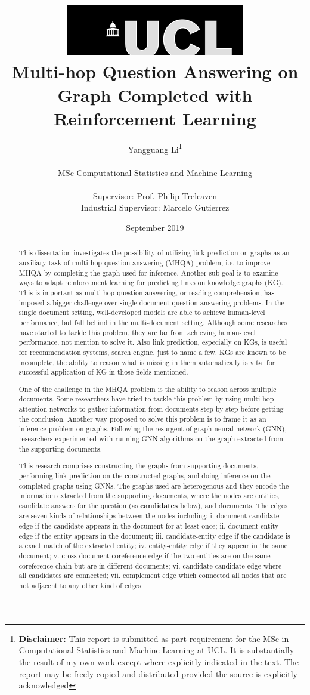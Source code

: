\documentclass{report}
\title{         { \includegraphics[scale=.5]{ucl_logo.png}}\\
{{\Huge Multi-hop Question Answering on Graph Completed with Reinforcement Learning}}\\
                }
\date{September 2019}
\author{Yangguang Li\thanks{
{\bf Disclaimer:}
This report is submitted as part requirement for the MSc in Computational Statistics and Machine Learning at UCL. It is
substantially the result of my own work except where explicitly indicated in the text. The report may be freely copied and distributed provided the source is explicitly acknowledged}
\\ \\
MSc Computational Statistics and Machine Learning\\ \\
Supervisor: Prof. Philip Treleaven\\
Industrial Supervisor: Marcelo Gutierrez}
\begin{document}
 \onehalfspacing
\maketitle
\begin{abstract}
\begin{singlespace}
This dissertation investigates the possibility of utilizing link prediction on graphs as an auxiliary task of multi-hop question answering (MHQA) problem, i.e. to improve MHQA by completing the graph used for inference. Another sub-goal is to examine ways to adapt reinforcement learning for predicting links on knowledge graphs (KG). This is important as multi-hop question answering, or reading comprehension, has imposed a bigger challenge over single-document question answering problems. In the single document setting, well-developed models are able to achieve human-level performance, but fall behind in the multi-document setting. Although some researches have started to tackle this problem, they are far from achieving human-level performance, not mention to solve it. Also link prediction, especially on KGs, is useful for recommendation systems, search engine, just to name a few. KGs are known to be incomplete, the ability to reason what is missing in them automatically is vital for successful application of KG in those fields mentioned.

One of the challenge in the MHQA problem is the ability to reason across multiple documents. Some researchers have tried to tackle this problem by using multi-hop attention networks to gather information from documents step-by-step before getting the conclusion. Another way proposed to solve this problem is to frame it as an inference problem on graphs. Following the resurgent of graph neural network (GNN), researchers experimented with running GNN algorithms on the graph extracted from the supporting documents.

This research comprises constructing the graphs from supporting documents, performing link prediction on the constructed graphs, and doing inference on the completed graphs using GNNs. The graphs used are heterogenous and they encode the information extracted from the supporting documents, where the nodes are entities, candidate answers for the question (as \textbf{candidates} below), and documents. The edges are seven kinds of relationships between the nodes including: i. document-candidate edge if the candidate appears in the document for at least once; ii. document-entity edge if the entity appears in the document; iii. candidate-entity edge if the candidate is a exact match of the extracted entity; iv. entity-entity edge if they appear in the same document; v. cross-document coreference edge if the two entities are on the same coreference
chain but are in different documents; vi. candidate-candidate edge where all candidates are connected; vii. complement edge which connected all nodes that are not adjacent to any other kind of edges.


\end{singlespace}
\end{abstract}
\end{document}
